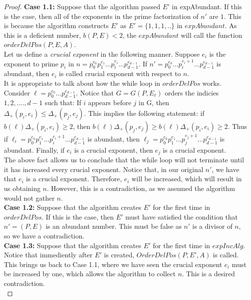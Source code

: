 \documentclass[../paper.tex]{subfiles}
\begin{document}
\begin{proof}
\textbf{Case 1.1:}  
  Suppose that the algorithm passed $E'$ in expAbundant. If this
is the case, then all of the exponents in the prime factorization
of $n'$ are $1$. This is because the algorithm constructs $E'$ as
$E' = \{1,1,1,..\}$ in $expAbundant$. As this is a deficient number, 
$b(P,E) < 2$, the $expAbundant$ will call the function 
$orderDelPos(P,E,A)$.
\\

  Let us define a \textit{crucial exponent} in the following
manner. Suppose $e_i$ is the exponent to prime $p_i$ in $n =
p_0^{e_0} p_1^{e_1} ... p_i^{e_i} ... p_{d-1}^{e_{d-1}}$. If 
$n' = p_0^{e_0} ... p_i^{e_i + 1} ... p_{d-1}^{e_{d-1}}$
is abundant, then $e_i$ is called crucial exponent with respect to
$n$.
\\

  It is appropriate to talk about how the while loop in 
$orderDelPos$ works. Consider $\ell = p_0^{e_0} ...
p_{d-1}^{e_{d-1}}$. Notice that $G = G(P,E_{\ell})$ orders the
indicies ${1,2,....,d-1}$ such that: If $i$ appears before $j$ 
in G, then $\Delta_+(p_i, e_i) \leq \Delta_+(p_j, e_j)$. This
implies the following statement: if $b(\ell) \Delta_+(p_i, e_i) 
\geq 2$, then $b(\ell) \Delta_+(p_j, e_j) \geq b(\ell)
\Delta_+(p_i,e_i) \geq 2$. Thus if $\ell_i = 
p_0^{e_0} p_1^{e_1} ... p_{i}^{e_i + 1} ... p_{d-1}^{e_{d-1}}$ 
is abundant, then 
$\ell_j = p_0^{e_0} p_1^{e_1} ... p_{j}^{e_j + 1} ... p_{d-1}^{e_{d-1}}$ 
is abundant. Finally, if $e_i$ is a crucial exponent, then $e_j$ 
is a crucial exponent.
\\

  The above fact allows us to conclude that the while loop will not
terminate until it has increased every crucial exponent. Notice
that, in our original $n'$, we have that $e_i$ is a crucial
exponent. Therefore, $e_i$ will be increased, which will result in
us obtaining $n$. However, this is a contradiction, as we assumed
the algorithm would not gather $n$.
\\

\textbf{Case 1.2:}
  Suppose that the algorithm creates $E'$ for the first time in
$orderDelPos$. If this is the case, then $E'$ must have satisfied
the condition that $n' = (P,E)$ is an abundant number. This must
be false as $n'$ is a divisor of $n$, so we have a contradiction.
\\

\textbf{Case 1.3:}
  Suppose that the algorithm creates $E'$ for the first time in
$expIncAlg$. Notice that immediently after $E'$ is created,
$OrderDelPos(P,E',A)$ is called. This brings us back to Case 1.1, 
where we have seen the crucial exponent $e_i$ must be increased by 
one, which allows the algorithm to collect $n$. This is a desired
contradiction.
\\


\end{proof}
\end{document}
